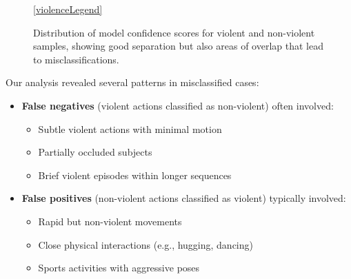 \documentclass[conference]{IEEEtran}
\begin{document}
\begin{figure}[htbp]
\begin{adjustbox}{max width=0.48\textwidth}
    \end{adjustbox}

    \begin{center}
        {\ref{violenceLegend}}
    \end{center}

    \caption{Distribution of model confidence scores for violent and non-violent samples, showing good separation but also areas of overlap that lead to misclassifications.}
    \label{fig:qual_analysis}
\end{figure}

Our analysis revealed several patterns in misclassified cases:

\begin{itemize}
    \item \textbf{False negatives} (violent actions classified as non-violent) often involved:
          \begin{itemize}
              \item Subtle violent actions with minimal motion
              \item Partially occluded subjects
              \item Brief violent episodes within longer sequences
          \end{itemize}

    \item \textbf{False positives} (non-violent actions classified as violent) typically involved:
          \begin{itemize}
              \item Rapid but non-violent movements
              \item Close physical interactions (e.g., hugging, dancing)
              \item Sports activities with aggressive poses
          \end{itemize}
\end{itemize}
\end{document}

